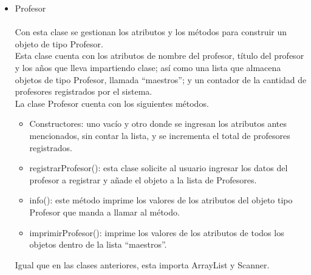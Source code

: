 \documentclass[12pt]{report}
\begin{document}
\begin{itemize}
\item Profesor \\ \\
Con esta clase se gestionan los atributos y los métodos para construir un objeto de tipo Profesor.\\
Esta clase cuenta con los atributos de nombre del profesor, título del profesor y los años que lleva impartiendo clase; así como una lista que almacena objetos de tipo Profesor, llamada “maestros”; y un contador de la cantidad de profesores registrados por el sistema.\\
La clase Profesor cuenta con los siguientes métodos.
\begin{itemize}
\item  Constructores: uno vacío y otro donde se ingresan los atributos antes mencionados, sin contar la lista, y se incrementa el total de profesores registrados.
\item registrarProfesor(): esta clase solicite al usuario ingresar los datos del profesor a registrar y añade el objeto a la lista de Profesores.
\item info(): este método imprime los valores de los atributos del objeto tipo Profesor que manda a llamar al método.
\item imprimirProfesor(): imprime los valores de los atributos de todos los objetos dentro de la lista “maestros”.
\end{itemize}
Igual que en las clases anteriores, esta importa ArrayList y Scanner.
\\


\end{itemize}
\end{document}
